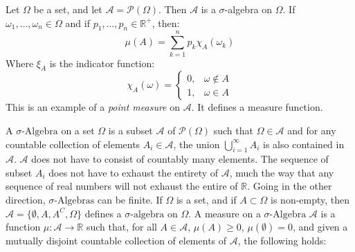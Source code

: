                 \begin{example}
                    Let $\Omega$ be a set, and let
                    $\mathcal{A}=\mathcal{P}(\Omega)$. Then
                    $\mathcal{A}$ is a $\sigma$-algebra on $\Omega$.
                    If $\omega_{1},\hdots,\omega_{n}\in\Omega$ and if
                    $p_{1},\hdots,p_{n}\in\mathbb{R}^{+}$, then:
                    \begin{equation}
                        \mu(A)=\sum_{k=1}^{n}p_{k}\chi_{A}(\omega_{k})
                    \end{equation}
                    Where $\xi_{A}$ is the indicator function:
                    \begin{equation}
                        \chi_{A}(\omega)=
                        \begin{cases}
                            0,&\omega\notin{A}\\
                            1,&\omega\in{A}
                        \end{cases}
                    \end{equation}
                    This is an example of a \textit{point measure}
                    on $\mathcal{A}$. It defines a measure function.
                \end{example}
            A $\sigma\text{-Algebra}$ on a set $\Omega$ is a subset
            $\mathcal{A}$ of $\mathcal{P}(\Omega)$ such that
            $\Omega\in\mathcal{A}$ and for any countable collection of
            elements $A_{i}\in\mathcal{A}$, the union
            $\bigcup_{i=1}^{\infty}A_{i}$ is also contained in
            $\mathcal{A}$. $\mathcal{A}$ does not have to consist of
            countably many elements. The sequence of subset $A_{i}$ does
            not have to exhaust the entirety of $\mathcal{A}$, much the
            way that any sequence of real numbers will not exhaust the
            entire of $\mathbb{R}$. Going in the other direction,
            $\sigma\text{-Algebras}$ can be finite. If $\Omega$ is a
            set, and if $A\subset\Omega$ is non-empty, then
            $\mathcal{A}=\{\emptyset,A,A^{C},\Omega\}$ defines a
            $\sigma\text{-algebra}$ on $\Omega$. A measure on a
            $\sigma\text{-Algebra}$ $\mathcal{A}$ is a function
            $\mu:\mathcal{A}\rightarrow\mathbb{R}$ such that, for all
            $A\in\mathcal{A}$, $\mu(A)\geq{0}$, $\mu(\emptyset)=0$, and
            given a mutually disjoint countable collection of elements of
            $\mathcal{A}$, the following holds:
